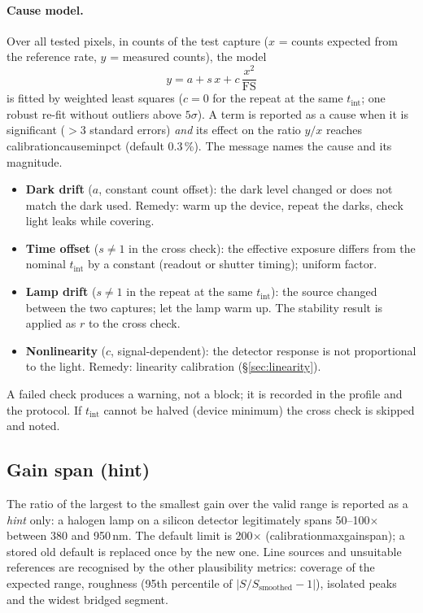 \documentclass[12pt,a4paper]{article}
\DeclareRobustCommand{\key}[1]{{\ttfamily\small\color{acc2}\def\_{\rawus\allowbreak}#1}}
\newcommand{\nm}{\,nm}
\begin{document}
\paragraph{Cause model.} Over all tested pixels, in counts of the test capture
($x$ = counts expected from the reference rate, $y$ = measured counts), the
model
\[
  y = a + s\,x + c\,\frac{x^{2}}{\mathrm{FS}}
\]
is fitted by weighted least squares ($c=0$ for the repeat at the same
$t_{\mathrm{int}}$; one robust re-fit without outliers above $5\sigma$). A term
is reported as a cause when it is significant ($>3$ standard errors) \emph{and}
its effect on the ratio $y/x$ reaches \key{calibration\_cause\_min\_pct} (default
0.3\,\%). The message names the cause and its magnitude.
\begin{itemize}
  \item \textbf{Dark drift} ($a$, constant count offset): the dark level changed
        or does not match the dark used. Remedy: warm up the device, repeat the
        darks, check light leaks while covering.
  \item \textbf{Time offset} ($s\neq1$ in the cross check): the effective
        exposure differs from the nominal $t_{\mathrm{int}}$ by a constant
        (readout or shutter timing); uniform factor.
  \item \textbf{Lamp drift} ($s\neq1$ in the repeat at the same $t_{\mathrm{int}}$):
        the source changed between the two captures; let the lamp warm up. The
        stability result is applied as $r$ to the cross check.
  \item \textbf{Nonlinearity} ($c$, signal-dependent): the detector response is
        not proportional to the light. Remedy: linearity calibration
        (\S\ref{sec:linearity}).
\end{itemize}
A failed check produces a warning, not a block; it is recorded in the profile and
the protocol. If $t_{\mathrm{int}}$ cannot be halved (device minimum) the cross
check is skipped and noted.

\subsection{Gain span (hint)}\label{sec:speccal-gainspan}
The ratio of the largest to the smallest gain over the valid range is reported
as a \emph{hint} only: a halogen lamp on a silicon detector legitimately spans
50--100$\times$ between 380 and 950\nm. The default limit is 200$\times$
(\key{calibration\_max\_gain\_span}); a stored old default is replaced once by
the new one. Line sources and unsuitable references are recognised by the other
plausibility metrics: coverage of the expected range, roughness (95th percentile
of $|S/S_{\mathrm{smoothed}}-1|$), isolated peaks and the widest bridged
segment.
\end{document}
